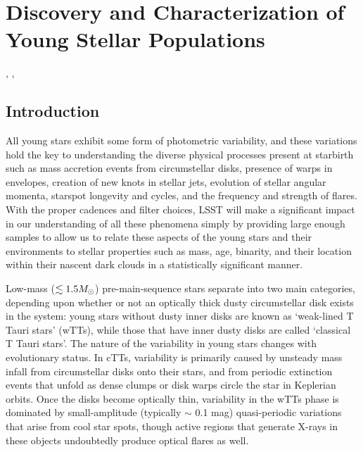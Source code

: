 %
%

\section{Discovery and Characterization of Young Stellar Populations}
\def\secname{youngstars}\label{sec:\secname}

,
,

\subsection{Introduction}

All young stars exhibit some form of
photometric variability, and these variations hold the key
to understanding the diverse physical processes present at starbirth
such as mass accretion events from circumstellar disks, presence of
warps in envelopes, creation of new knots in stellar jets,
evolution of stellar angular momenta, starspot longevity and cycles,
and the frequency and strength of flares.
With the proper cadences and filter choices,
LSST will make a significant impact in our understanding of all
these phenomena simply by providing large enough samples to allow
us to relate these aspects of the young stars and their environments
to stellar properties such as mass, age, binarity,
and their location within their nascent dark clouds in a statistically
significant manner.

Low-mass ($\lesssim 1.5 M_{\odot}$) pre-main-sequence stars separate
into two main categories, depending upon whether or not an optically thick
dusty circumstellar disk exists in the system: young stars without dusty
inner disks are known as `weak-lined T Tauri stars' (wTTs), while those
that have inner dusty disks are called `classical T Tauri stars'.
The nature of the variability in young stars changes with evolutionary status.
In cTTs, variability is primarily caused by unsteady mass infall from circumstellar disks
onto their stars, and from periodic extinction events that unfold as dense
clumps or disk warps circle the star in Keplerian orbits.
Once the disks become optically thin, variability in the wTTs phase
is dominated by small-amplitude (typically $\sim$ 0.1 mag)
quasi-periodic variations that arise
from cool star spots, though active regions that generate X-rays in
these objects undoubtedly produce optical flares as well. 

